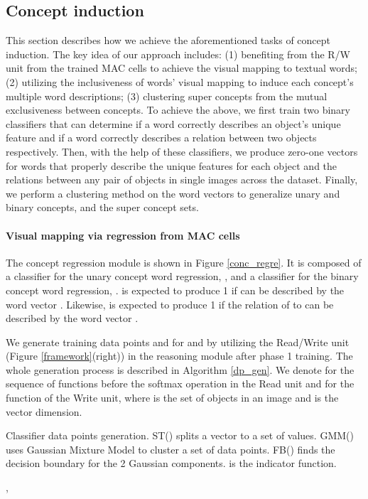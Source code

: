 \documentclass[final]{cvpr}
\begin{document}
\subsection{Concept induction}
\label{ssec:concept_induction}
This section describes how we achieve the aforementioned tasks of concept induction. The key idea of our approach includes: (1) benefiting from the R/W unit from the trained MAC cells to achieve the visual mapping to textual words; (2) utilizing the inclusiveness of words' visual mapping to induce each concept's multiple word descriptions; (3) clustering super concepts from the mutual exclusiveness between concepts.
To achieve the above, we first train two binary classifiers that can determine if a word correctly describes an object's unique feature and if a word correctly describes a relation between two objects respectively. Then, with the help of these classifiers, we produce zero-one vectors for words that properly describe the unique features for each object and the relations between any pair of objects in single images across the dataset. Finally, we perform a clustering method on the word vectors to generalize unary and binary concepts, and the super concept sets.
\vspace{-3mm}

\paragraph{Visual mapping via regression from MAC cells}
The concept regression module is shown in Figure \ref{conc_regre}. It is composed of a classifier for the unary concept word regression, , and a classifier for the binary concept word regression, .  is expected to produce 1 if  can be described by the word vector . Likewise,  is expected to produce 1 if the relation of  to  can be described by the word vector  . 

We generate training data points  and  for  and  by utilizing the Read/Write unit (Figure \ref{framework}(right)) in the reasoning module after phase 1 training.
The whole generation process is described in Algorithm \ref{dp_gen}.
We denote  for the sequence of functions before the softmax operation in the Read unit and  for the function of the Write unit, where  is the set of objects in an image and  is the vector dimension.

\begin{algorithm}[t]
\SetAlgoLined
\small
 \caption{\small{Classifier data points generation. ST() splits a vector  to a set of  values. GMM() uses Gaussian Mixture Model to cluster a set of data points. FB() finds the decision boundary for the 2 Gaussian components.  is the indicator function.}}
 \label{dp_gen}
\KwResult{, }
 , \\
 \For{}{, } 
\end{algorithm}
\end{document}
